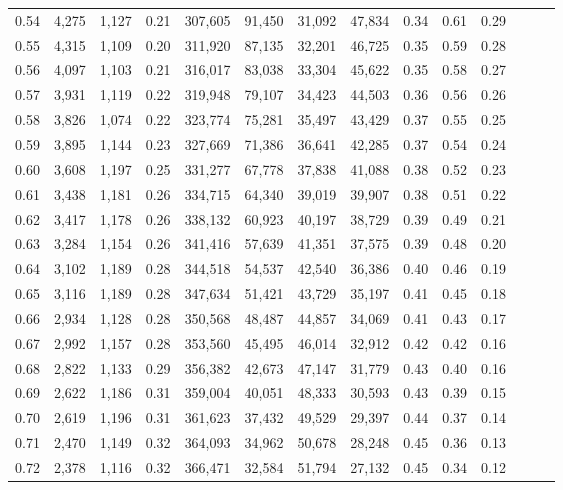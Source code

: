 \begin{tabular}{rrrrrrrrrrrrrr}
0.54 &  4,275 &  1,127 &  0.21 &  307,605 &   91,450 &  31,092 &  47,834 &  0.34 &  0.61 &      0.29 \\
0.55 &  4,315 &  1,109 &  0.20 &  311,920 &   87,135 &  32,201 &  46,725 &  0.35 &  0.59 &      0.28 \\
0.56 &  4,097 &  1,103 &  0.21 &  316,017 &   83,038 &  33,304 &  45,622 &  0.35 &  0.58 &      0.27 \\
0.57 &  3,931 &  1,119 &  0.22 &  319,948 &   79,107 &  34,423 &  44,503 &  0.36 &  0.56 &      0.26 \\
0.58 &  3,826 &  1,074 &  0.22 &  323,774 &   75,281 &  35,497 &  43,429 &  0.37 &  0.55 &      0.25 \\
0.59 &  3,895 &  1,144 &  0.23 &  327,669 &   71,386 &  36,641 &  42,285 &  0.37 &  0.54 &      0.24 \\
0.60 &  3,608 &  1,197 &  0.25 &  331,277 &   67,778 &  37,838 &  41,088 &  0.38 &  0.52 &      0.23 \\
0.61 &  3,438 &  1,181 &  0.26 &  334,715 &   64,340 &  39,019 &  39,907 &  0.38 &  0.51 &      0.22 \\
0.62 &  3,417 &  1,178 &  0.26 &  338,132 &   60,923 &  40,197 &  38,729 &  0.39 &  0.49 &      0.21 \\
0.63 &  3,284 &  1,154 &  0.26 &  341,416 &   57,639 &  41,351 &  37,575 &  0.39 &  0.48 &      0.20 \\
0.64 &  3,102 &  1,189 &  0.28 &  344,518 &   54,537 &  42,540 &  36,386 &  0.40 &  0.46 &      0.19 \\
0.65 &  3,116 &  1,189 &  0.28 &  347,634 &   51,421 &  43,729 &  35,197 &  0.41 &  0.45 &      0.18 \\
0.66 &  2,934 &  1,128 &  0.28 &  350,568 &   48,487 &  44,857 &  34,069 &  0.41 &  0.43 &      0.17 \\
0.67 &  2,992 &  1,157 &  0.28 &  353,560 &   45,495 &  46,014 &  32,912 &  0.42 &  0.42 &      0.16 \\
0.68 &  2,822 &  1,133 &  0.29 &  356,382 &   42,673 &  47,147 &  31,779 &  0.43 &  0.40 &      0.16 \\
0.69 &  2,622 &  1,186 &  0.31 &  359,004 &   40,051 &  48,333 &  30,593 &  0.43 &  0.39 &      0.15 \\
0.70 &  2,619 &  1,196 &  0.31 &  361,623 &   37,432 &  49,529 &  29,397 &  0.44 &  0.37 &      0.14 \\
0.71 &  2,470 &  1,149 &  0.32 &  364,093 &   34,962 &  50,678 &  28,248 &  0.45 &  0.36 &      0.13 \\
0.72 &  2,378 &  1,116 &  0.32 &  366,471 &   32,584 &  51,794 &  27,132 &  0.45 &  0.34 &      0.12 \\

\end{tabular}
